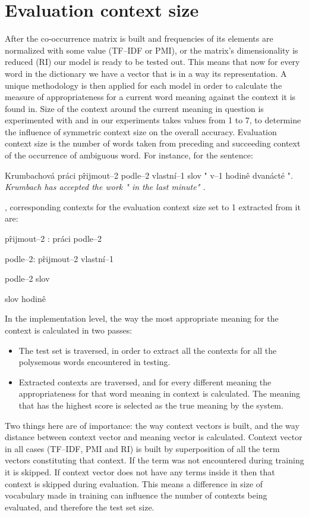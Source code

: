 \section{Evaluation context size} 
After the co-occurrence matrix is built and frequencies of its elements are normalized with some 
value (TF--IDF or PMI), or the matrix's dimensionality is reduced (RI) our model is ready to be tested out.
This means that now for every word in the dictionary we have a vector that is in a way its representation.
A unique methodology is then applied for each model in order to calculate the measure of appropriateness for a current word meaning against the context it is found in. Size of the context around the current meaning in question is experimented with and in our experiments takes values from 1 to 7, to determine the influence of symmetric context size on the overall accuracy. 
Evaluation context size is the number of words taken from preceding and succeeding context of the 
occurrence of ambiguous word. For instance, for the sentence:
\begin{examples}
\item Krumbachov\'a pr\'aci p\^rijmout--2 podle--2 vlastn\'i--1 slov " v--1 hodin\^e dvan\'act\'e ".
\glt \textit{ Krumbach has accepted the work " in the last minute"  .}
\end{examples}
, corresponding contexts for the evaluation context size set to 1 extracted from it are:
\begin{examples}
\item p\^rijmout--2 : pr\'aci  podle--2
\item  podle--2: p\^rijmout--2 vlastn\'i--1
\item podle--2 slov
\item slov  hodin\^e
\end{examples}


In the implementation level, the way the most appropriate meaning for the context is calculated in two passes:
\begin{itemize}
\item The test set is traversed, in order to extract all the contexts for all the polysemous words 
encountered  in testing.
\item Extracted contexts are traversed, and for every different meaning the appropriateness for that 
word meaning in context is calculated. The meaning that has the highest score is selected as the 
true meaning by the system.
\end{itemize}  
Two things here are of importance: the way context vectors is built, and the way distance between context vector and meaning vector is calculated. Context vector in all cases (TF--IDF, PMI and RI) is 
built by superposition of all the term vectors constituting that context. If the term was not encountered 
during training it is skipped. If context vector does not have any terms inside it then that context is skipped during evaluation. This means a difference in size of vocabulary made in training can influence the number
of contexts being evaluated, and therefore the test set size. 

